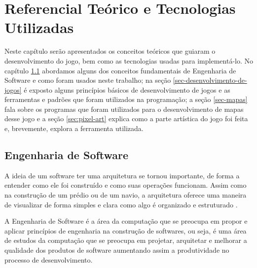 \chapter{Referencial Teórico e Tecnologias Utilizadas}
\label{sec-referencial}
Neste capítulo serão apresentados os conceitos teóricos que guiaram o desenvolvimento do jogo, bem como as tecnologias usadas para implementá-lo. No capítulo \ref{sec:engenharia-de-software} abordamos alguns dos conceitos fundamentais de Engenharia de Software e como foram usados neste trabalho; na seção \ref{sec-desenvolvimento-de-jogos} é exposto alguns princípios básicos de desenvolvimento de jogos e as ferramentas e padrões que foram utilizados na programação; a seção \ref{sec-mapas} fala sobre os programas que foram utilizados para o desenvolvimento de mapas desse jogo e a seção \ref{sec:pixel-art} explica como a parte artística do jogo foi feita e, brevemente, explora a ferramenta utilizada.

\section{Engenharia de Software}
\label{sec:engenharia-de-software}
A ideia de um software ter uma arquitetura se tornou importante, de forma a entender como ele foi construído e como suas operações funcionam. Assim como na construção de um prédio ou de um navio, a arquitetura oferece uma maneira de visualizar de forma simples e clara como algo é organizado e estruturado \cite{budgen2020software}. 

A Engenharia de Software é a área da computação que se preocupa em propor e aplicar princípios de engenharia na construção de softwares\cite{engsoftmoderna}, ou seja, é uma área de estudos da computação que se preocupa em projetar, arquitetar e melhorar a qualidade dos produtos de software aumentando assim a produtividade no processo de desenvolvimento. 

